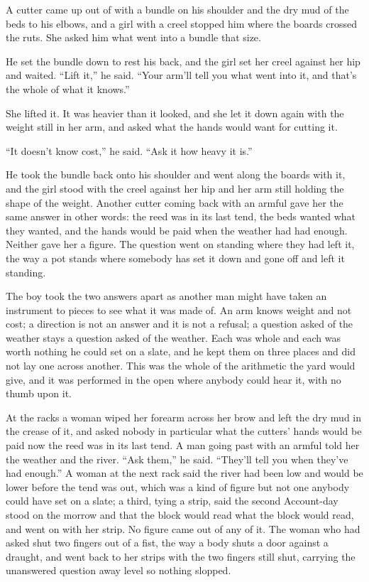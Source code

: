 \scenebreak

A cutter came up out of  with a bundle on his shoulder and the dry mud of the beds to his elbows, and a girl with a creel stopped him where the boards crossed the ruts. She asked him what went into a bundle that size.

He set the bundle down to rest his back, and the girl set her creel against her hip and waited. “Lift it,” he said. “Your arm'll tell you what went into it, and that's the whole of what it knows.”

She lifted it. It was heavier than it looked, and she let it down again with the weight still in her arm, and asked what the hands would want for cutting it.

“It doesn't know cost,” he said. “Ask it how heavy it is.”

He took the bundle back onto his shoulder and went along the boards with it, and the girl stood with the creel against her hip and her arm still holding the shape of the weight. Another cutter coming back with an armful gave her the same answer in other words: the reed was in its last tend, the beds wanted what they wanted, and the hands would be paid when the weather had had enough. Neither gave her a figure. The question went on standing where they had left it, the way a pot stands where somebody has set it down and gone off and left it standing.

The boy took the two answers apart as another man might have taken an instrument to pieces to see what it was made of. An arm knows weight and not cost; a direction is not an answer and it is not a refusal; a question asked of the weather stays a question asked of the weather. Each was whole and each was worth nothing he could set on a slate, and he kept them on three places and did not lay one across another. This was the whole of the arithmetic the yard would give, and it was performed in the open where anybody could hear it, with no thumb upon it.

At the racks a woman wiped her forearm across her brow and left the dry mud in the crease of it, and asked nobody in particular what the cutters' hands would be paid now the reed was in its last tend. A man going past with an armful told her the weather and the river. “Ask them,” he said. “They'll tell you when they've had enough.” A woman at the next rack said the river had been low and would be lower before the tend was out, which was a kind of figure but not one anybody could have set on a slate; a third, tying a strip, said the second Account-day stood on the morrow and that the block would read what the block would read, and went on with her strip. No figure came out of any of it. The woman who had asked shut two fingers out of a fist, the way a body shuts a door against a draught, and went back to her strips with the two fingers still shut, carrying the unanswered question away level so nothing slopped.

